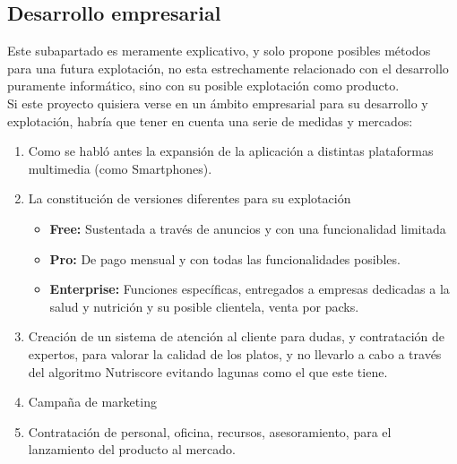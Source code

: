 \subsection{Desarrollo empresarial}
Este subapartado es meramente explicativo, y solo propone posibles métodos para una futura explotación, no esta estrechamente relacionado con el desarrollo puramente informático, sino con su posible explotación como producto.
\\
Si este proyecto quisiera verse en un ámbito empresarial para su desarrollo y explotación, habría que tener en cuenta una serie de medidas y mercados:
\begin{enumerate}
\item	Como se habló antes la expansión de la aplicación a distintas plataformas multimedia (como Smartphones).
\item	La constitución de versiones diferentes para su explotación
\begin{itemize}
\item	\textbf{Free:} Sustentada a través de anuncios y con una funcionalidad limitada
\item	\textbf{Pro:} De pago mensual y con todas las funcionalidades posibles.
\item	\textbf{Enterprise:} Funciones específicas, entregados a empresas dedicadas a la salud y nutrición y su posible clientela, venta por packs.
\end{itemize}
\item	Creación de un sistema de atención al cliente para dudas, y contratación de expertos, para valorar la calidad de los platos, y no llevarlo a cabo a través del algoritmo Nutriscore evitando lagunas como el que este tiene.
\item	Campaña de marketing
\item	Contratación de personal, oficina, recursos, asesoramiento, para el lanzamiento del producto al mercado.
\end{enumerate}

